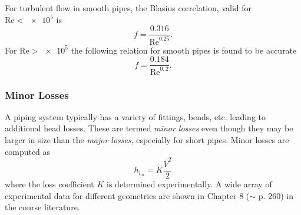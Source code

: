 For turbulent flow in smooth pipes, the Blasius correlation, valid for $\mathrm{Re} < \num{e5}$ is
\[ 
f = \frac{\num{0,316} }{\mathrm{Re}^{\num{0,25} }}
.\]
For $\mathrm{Re} > \num{e5}$ the following relation for smooth pipes is found to be accurate
\[ 
f = \frac{\num{0,184}}{\mathrm{Re}^{0,2}}
.\]


\subsubsection{Minor Losses}
A piping system typically has a variety of fittings, bends, etc. leading to additional head losses.
These are termed \textit{minor losses} even though they may be larger in size than the \textit{major losses}, especially for short pipes.
Minor losses are computed as
\begin{equation}
  h_{l_m} = K \frac{\overline{V}^2}{2}
\end{equation}
where the loss coefficient $K$ is determined experimentally. A wide array of experimental data for different geometries are shown in Chapter 8 ($\sim$ p. 260) in the course literature.



